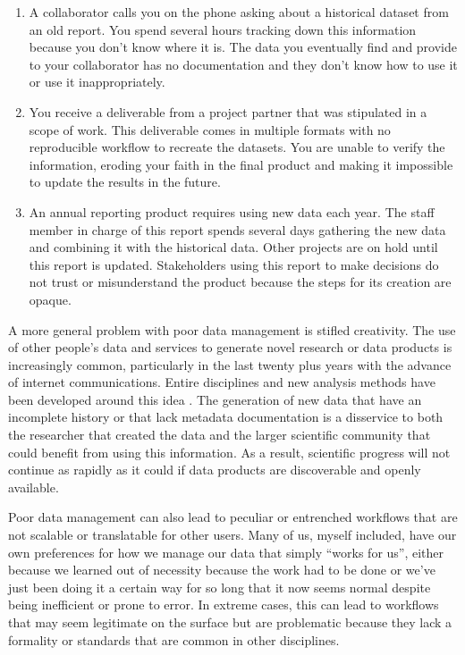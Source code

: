 \documentclass[
]{book}
\providecommand{\tightlist}{%
  \setlength{\itemsep}{0pt}\setlength{\parskip}{0pt}}
\begin{document}
\begin{enumerate}
\def\labelenumi{\arabic{enumi})}
\tightlist
\item
  A collaborator calls you on the phone asking about a historical dataset from an old report. You spend several hours tracking down this information because you don't know where it is. The data you eventually find and provide to your collaborator has no documentation and they don't know how to use it or use it inappropriately.
\item
  You receive a deliverable from a project partner that was stipulated in a scope of work. This deliverable comes in multiple formats with no reproducible workflow to recreate the datasets. You are unable to verify the information, eroding your faith in the final product and making it impossible to update the results in the future.
\item
  An annual reporting product requires using new data each year. The staff member in charge of this report spends several days gathering the new data and combining it with the historical data. Other projects are on hold until this report is updated. Stakeholders using this report to make decisions do not trust or misunderstand the product because the steps for its creation are opaque.
\end{enumerate}

A more general problem with poor data management is stifled creativity. The use of other people's data and services \citep[i.e., ``OPEDAS'';][]{Mons18} to generate novel research or data products is increasingly common, particularly in the last twenty plus years with the advance of internet communications. Entire disciplines and new analysis methods have been developed around this idea \citep[e.g., meta-analysis;][]{Carpenter09, Lortie14}. The generation of new data that have an incomplete history or that lack metadata documentation is a disservice to both the researcher that created the data and the larger scientific community that could benefit from using this information. As a result, scientific progress will not continue as rapidly as it could if data products are discoverable and openly available.

Poor data management can also lead to peculiar or entrenched workflows that are not scalable or translatable for other users. Many of us, myself included, have our own preferences for how we manage our data that simply ``works for us'', either because we learned out of necessity because the work had to be done or we've just been doing it a certain way for so long that it now seems normal despite being inefficient or prone to error. In extreme cases, this can lead to workflows that may seem legitimate on the surface but are problematic because they lack a formality or standards that are common in other disciplines.
\end{document}
